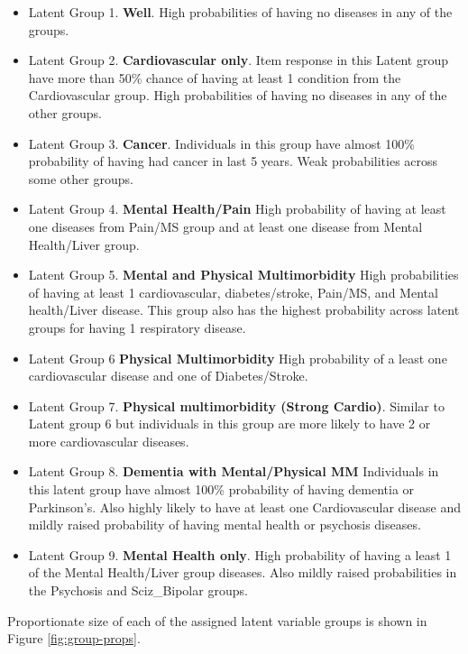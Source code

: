 \documentclass[12pt,]{report}
\providecommand{\tightlist}{%
  \setlength{\itemsep}{0pt}\setlength{\parskip}{0pt}}
\begin{document}
\begin{itemize}
\tightlist
\item
  Latent Group 1. \textbf{Well}. High probabilities of having no
  diseases in any of the groups.
\item
  Latent Group 2. \textbf{Cardiovascular only}. Item response in this
  Latent group have more than 50\% chance of having at least 1 condition
  from the Cardiovascular group. High probabilities of having no
  diseases in any of the other groups.
\item
  Latent Group 3. \textbf{Cancer}. Individuals in this group have almost
  100\% probability of having had cancer in last 5 years. Weak
  probabilities across some other groups.
\item
  Latent Group 4. \textbf{Mental Health/Pain} High probability of having
  at least one diseases from Pain/MS group and at least one disease from
  Mental Health/Liver group.
\item
  Latent Group 5. \textbf{Mental and Physical Multimorbidity} High
  probabilities of having at least 1 cardiovascular, diabetes/stroke,
  Pain/MS, and Mental health/Liver disease. This group also has the
  highest probability across latent groups for having 1 respiratory
  disease.
\item
  Latent Group 6 \textbf{Physical Multimorbidity} High probability of a
  least one cardiovascular disease and one of Diabetes/Stroke.
\item
  Latent Group 7. \textbf{Physical multimorbidity (Strong Cardio)}.
  Similar to Latent group 6 but individuals in this group are more
  likely to have 2 or more cardiovascular diseases.
\item
  Latent Group 8. \textbf{Dementia with Mental/Physical MM} Individuals
  in this latent group have almost 100\% probability of having dementia
  or Parkinson's. Also highly likely to have at least one Cardiovascular
  disease and mildly raised probability of having mental health or
  psychosis diseases.
\item
  Latent Group 9. \textbf{Mental Health only}. High probability of
  having a least 1 of the Mental Health/Liver group diseases. Also
  mildly raised probabilities in the Psychosis and Sciz\_Bipolar groups.
\end{itemize}

Proportionate size of each of the assigned latent variable groups is
shown in Figure \ref{fig:group-props}.
\end{document}
